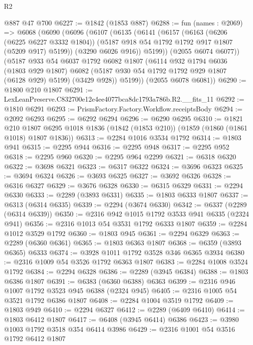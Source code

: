\begin{lexlean}{R2}
\begin{coremodule}
    @887
    @47
    @700
@6227 := @1842 (@1853 @887)
@6288 := fun (names : @2069) =>
  @6068
    (@6090
      (@6096
        (@6107
          (@6135
            (@6141
              (@6157
                (@6163
                  (@6206 (@6225 @6227 @3332 @1804))
                  (@5187 @918 @54 @1792 @1792 @917 @1807 (@5209 @917) @5199))
                (@3290 @6026 @916))
              @5199))
          (@2055 @6074 @6077))
        (@5187
          @933
          @54
          @6037
          @1792
          @6082
          @1807
          (@6114
            @932
            @1794
            @6036
            (@1803 @929 @1807)
            @6082
            (@5187 @930 @54 @1792 @1792 @929 @1807 (@6128 @929) @5199)
            (@3429 @928))
          @5199))
      (@2055 @6078 @6081))
@6290 := @1800 @210 @1807
@6291 := LexLeanPreserve.C832700e12e4ee4077bca8dc1793a786b.R2.__fits_11
@6292 := @1810 @6291
@6293 := PrismFactory.Factory.Workflow.receiptsBody
@6294 := @2092 @6293
@6295 := @6292 @6294
@6296 := @6290 @6295
@6310 := @1821
    @210
    @1807
    @6295
    @1018
    @1836
    (@1842 (@1853 @210))
    (@1859 (@1860 (@1861 @1018) @1807 @1836))
@6313 := @2284 @1016 @3534 @1792
@6314 := @1803 @941
@6315 := @2295 @944
@6316 := @2295 @948
@6317 := @2295 @952
@6318 := @2295 @960
@6320 := @2295 @964 @2299
@6321 := @6318 @6320
@6322 := @3698 @6321
@6323 := @6317 @6322
@6324 := @3696 @6323
@6325 := @3694 @6324
@6326 := @3693 @6325
@6327 := @3692 @6326
@6328 := @6316 @6327
@6329 := @3676 @6328
@6330 := @6315 @6329
@6331 := @2294 @6330
@6333 := @2289 (@3893 @6331)
@6335 := @1803 @6333 @1807
@6337 := @6313 (@6314 @6335)
@6339 := @2294 (@3674 @6330)
@6342 := @6337 (@2289 (@6314 @6339))
@6350 := @2316 @942 @1015 @1792 @3533 @941 @6335 (@2324 @941)
@6356 := @2316 @1013 @54 @3531 @1792 @6333 @1807
@6359 := @2284 @1012 @3529 @1792
@6360 := @1803 @945
@6361 := @2294 @6329
@6363 := @2289 (@6360 @6361)
@6365 := @1803 @6363 @1807
@6368 := @6359 (@3893 @6365) @6333
@6374 := @3928 @1011 @1792 @3528 @346 @6365 @3934
@6380 := @2316 @1009 @54 @3526 @1792 @6363 @1807
@6383 := @2284 @1008 @3524 @1792
@6384 := @2294 @6328
@6386 := @2289 (@3945 @6384)
@6388 := @1803 @6386 @1807
@6391 := @6383 (@6360 @6388) @6363
@6399 := @2316 @946 @1007 @1792 @3523 @945 @6388 (@2324 @945)
@6405 := @2316 @1005 @54 @3521 @1792 @6386 @1807
@6408 := @2284 @1004 @3519 @1792
@6409 := @1803 @949
@6410 := @2294 @6327
@6412 := @2289 (@6409 @6410)
@6414 := @1803 @6412 @1807
@6417 := @6408 (@3945 @6414) @6386
@6423 := @3980 @1003 @1792 @3518 @354 @6414 @3986
@6429 := @2316 @1001 @54 @3516 @1792 @6412 @1807

\end{coremodule}
\end{lexlean}
